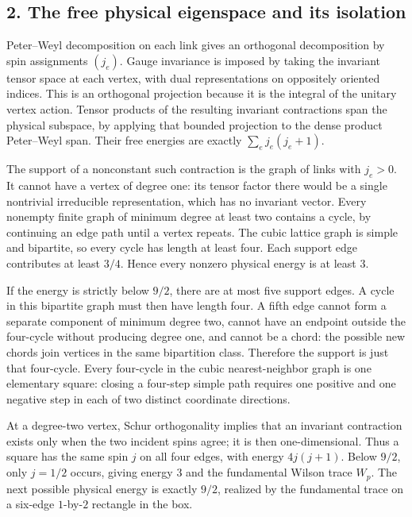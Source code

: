 \documentclass[
  11pt,
]{article}
\begin{document}
\subsection{2. The free physical eigenspace and its
isolation}\label{magnetic-part-5-the-free-physical-eigenspace-and-its-isolation}

Peter--Weyl decomposition on each link gives an orthogonal decomposition
by spin assignments \((j_e)\). Gauge invariance is imposed by taking the
invariant tensor space at each vertex, with dual representations on
oppositely oriented indices. This is an orthogonal projection because it
is the integral of the unitary vertex action. Tensor products of the
resulting invariant contractions span the physical subspace, by applying
that bounded projection to the dense product Peter--Weyl span. Their
free energies are exactly \(\sum_ej_e(j_e+1)\).

The support of a nonconstant such contraction is the graph of links with
\(j_e>0\). It cannot have a vertex of degree one: its tensor factor
there would be a single nontrivial irreducible representation, which has
no invariant vector. Every nonempty finite graph of minimum degree at
least two contains a cycle, by continuing an edge path until a vertex
repeats. The cubic lattice graph is simple and bipartite, so every cycle
has length at least four. Each support edge contributes at least
\(3/4\). Hence every nonzero physical energy is at least \(3\).

If the energy is strictly below \(9/2\), there are at most five support
edges. A cycle in this bipartite graph must then have length four. A
fifth edge cannot form a separate component of minimum degree two,
cannot have an endpoint outside the four-cycle without producing degree
one, and cannot be a chord: the possible new chords join vertices in the
same bipartition class. Therefore the support is just that four-cycle.
Every four-cycle in the cubic nearest-neighbor graph is one elementary
square: closing a four-step simple path requires one positive and one
negative step in each of two distinct coordinate directions.

At a degree-two vertex, Schur orthogonality implies that an invariant
contraction exists only when the two incident spins agree; it is then
one-dimensional. Thus a square has the same spin \(j\) on all four
edges, with energy \(4j(j+1)\). Below \(9/2\), only \(j=1/2\) occurs,
giving energy \(3\) and the fundamental Wilson trace \(W_p\). The next
possible physical energy is exactly \(9/2\), realized by the fundamental
trace on a six-edge \(1\)-by-\(2\) rectangle in the box.
\end{document}
